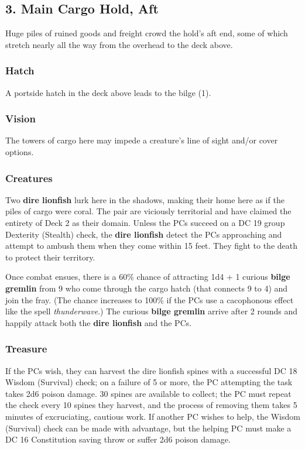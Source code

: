 \documentclass[10pt,a4paper,twoside,bg=print,twocolumn,openany,nodeprecatedcode]{dndbook}
\begin{document}
\subsection{3. Main Cargo Hold, Aft}
\begin{DndReadAloud}{}
Huge piles of ruined goods and freight crowd the hold's aft end, some of which stretch nearly all the way from the overhead to the deck above.

\end{DndReadAloud}

\subsubsection{Hatch}
A portside hatch in the deck above leads to the bilge (1).

\subsubsection{Vision}
The towers of cargo here may impede a creature's line of sight and/or cover options.

\subsubsection{Creatures}
Two \textbf{dire lionfish} lurk here in the shadows, making their home here as if the piles of cargo were coral. The pair are viciously territorial and have claimed the entirety of Deck 2 as their domain. Unless the PCs succeed on a DC 19 group Dexterity (Stealth) check, the \textbf{dire lionfish} detect the PCs approaching and attempt to ambush them when they come within 15 feet. They fight to the death to protect their territory.

Once combat ensues, there is a 60\% chance of attracting 1d4 + 1 curious \textbf{bilge gremlin} from 9 who come through the cargo hatch (that connects 9 to 4) and join the fray. (The chance increases to 100\% if the PCs use a cacophonous effect like the spell \textit{thunderwave}.) The curious \textbf{bilge gremlin} arrive after 2 rounds and happily attack both the \textbf{dire lionfish} and the PCs.

\subsubsection{Treasure}
If the PCs wish, they can harvest the dire lionfish spines with a successful DC 18 Wisdom (Survival) check; on a failure of 5 or more, the PC attempting the task takes 2d6 poison damage. 30 spines are available to collect; the PC must repeat the check every 10 spines they harvest, and the process of removing them takes 5 minutes of excruciating, cautious work. If another PC wishes to help, the Wisdom (Survival) check can be made with advantage, but the helping PC must make a DC 16 Constitution saving throw or suffer 2d6 poison damage.
\end{document}
